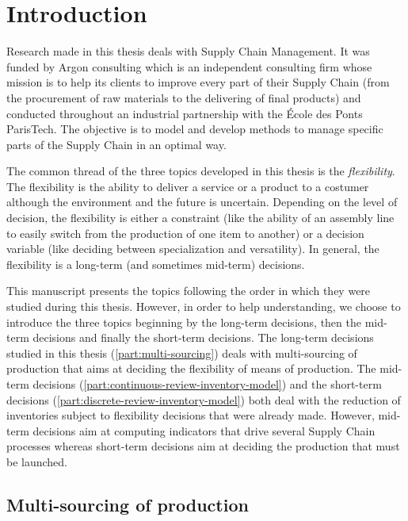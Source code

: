 \chapter{Introduction}
\label{chap:intro:en}


Research made in this thesis deals with Supply Chain Management.
It was funded by Argon consulting which is an independent consulting firm whose mission is to help its clients to improve every part of their Supply Chain (from the procurement of raw materials to the delivering of final products) and conducted throughout an industrial partnership with the \'Ecole des Ponts ParisTech.
The objective is to model and develop methods to manage specific parts of the Supply Chain in an optimal way.


The common thread of the three topics developed in this thesis is the \emph{flexibility}.
The flexibility is the ability to deliver a service or a product to a costumer although the environment and the future is uncertain.
Depending on the level of decision, the flexibility is either a constraint (like the ability of an assembly line to easily switch from the production of one item to another) or a decision variable (like deciding between specialization and versatility).
In general, the flexibility is a long-term (and sometimes mid-term) decisions.


This manuscript presents the topics following the order in which they were studied during this thesis.
However, in order to help understanding, we choose to introduce the three topics beginning by the long-term decisions, then the mid-term decisions and finally the short-term decisions.
The long-term decisions studied in this thesis (\cref{part:multi-sourcing}) deals with multi-sourcing of production that aims at deciding the flexibility of means of production.
The mid-term decisions (\cref{part:continuous-review-inventory-model}) and the short-term decisions (\cref{part:discrete-review-inventory-model}) both deal with the reduction of inventories subject to flexibility decisions that were already made.
However, mid-term decisions aim at computing indicators that drive several Supply Chain processes whereas short-term decisions aim at deciding the production that must be launched.




\section{Multi-sourcing of production}
\label{sec:intro:en:multi-sourcing}


